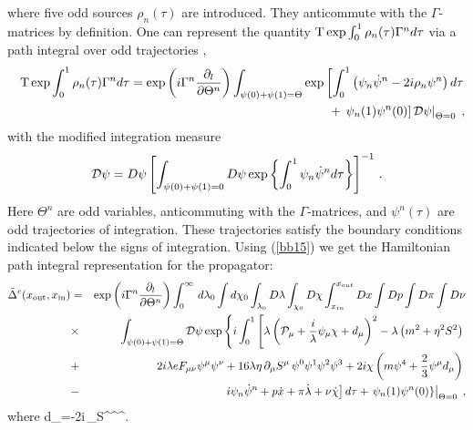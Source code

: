 where five  odd sources $\rho_n(\tau)$ are introduced. They
anticommute with the $\Gamma$-matrices by definition. One can
represent the quantity ${\rm T}\exp \int_0^1 \rho_n(\tau)\Gamma^n
d\tau$  via a  path integral over odd trajectories
\cite{FraGi91},
\begin{eqnarray}
\label{bb15}
&&{\rm T}\exp \int_0^1\rho_n(\tau)\Gamma^n d\tau  =
\exp\left(i\Gamma^n \frac{\partial_l}{\partial\Theta^n}   \right)
\int_{\psi(0)+\psi(1)=\Theta}\exp \left[ \int_0^1 \left(
\psi_n\dot{\psi}^n - 2i\rho_n\psi^n\right) d\tau \right.\nonumber
\\
&&
+ \left.\left.\psi_n(1)\psi^n(0)\right]{\cal D}
\psi\right|_{\Theta=0}\;,
\end{eqnarray}
with the modified integration measure
$$
{\cal D}\psi=D\psi\left[\int_{\psi
(0)+\psi (1)=0}
D\psi \exp\left\{\int^{1}
_{0}\psi_{n}\dot{\psi}^{n}d\tau\right\}\right]^{-1}\,.
$$
Here $\Theta^n$ are
odd variables, anticommuting with the $\Gamma$-matrices, and
$\psi^{n}(\tau)$ are odd trajectories of integration. These trajectories
satisfy the boundary conditions indicated below the signs of
integration. Using (\ref{bb15}) we get the Hamiltonian path
integral representation for the propagator:
\begin{eqnarray}\label{b16}
\tilde{\Delta}^{c}(x_{\rm out},x_{\rm in}) &=&\exp\left(i\Gamma^n
\frac{\partial_l}{\partial\Theta^n} \right)\int_0^\infty \, d\lambda_0
\int d\chi_{0}\int_{\lambda_{0}}D\lambda
\int_{\chi_{0}}D\chi \int_{x_{in}}^{x_{out}}Dx \int Dp \int D\pi \int
D\nu \nonumber \\
&\times&\int_{\psi(0)+\psi(1)=\Theta} {\cal D}\psi \exp \left\{i\int_0^1
\left[ \lambda\left({\cal P}_\mu+\frac{i}{\lambda}\psi_\mu\chi
+d_\mu\right)^2
-\lambda \left(m^2 + \eta^2 S^2\right)\right.\right. \nonumber \\
&+&\left.\left.
2i\lambda eF_{\mu\nu}\psi^\mu\psi^\nu
+ 16\lambda\eta\,\partial_\mu S^\mu\, {\psi^0} {\psi^1}
 {\psi^2} {\psi^3}+2i\chi\left(m\psi^4
+ \frac{2}{3}\psi^\mu d_\mu\right)\right.\right. \nonumber \\
&-&\left.\left. i\psi_n\dot{\psi}^n + p\dot{x}
+ \pi \dot{\lambda} +\nu \dot{\chi}\right] d\tau
+ \left.\psi_n(1)\psi^n(0) \right\}\right|_{\Theta=0} \;,
\end{eqnarray}
where
\beq
d_\mu=-2i\eta\,\epsilon_{\mu\nu\alpha\beta}S^\nu\psi^\al\psi^\be\;.
\label{dmu}
\eeq

